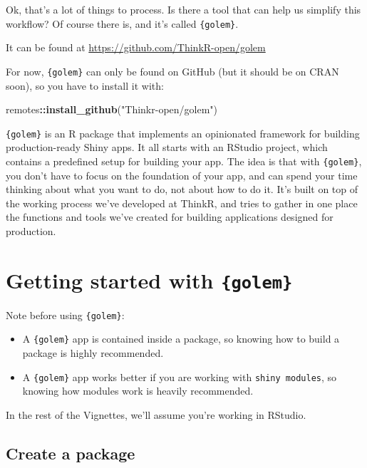 \documentclass[]{book}
\newenvironment{Shaded}{\begin{snugshade}}{\end{snugshade}}
\newcommand{\KeywordTok}[1]{\textcolor[rgb]{0.13,0.29,0.53}{\textbf{#1}}}
\newcommand{\NormalTok}[1]{#1}
\newcommand{\OperatorTok}[1]{\textcolor[rgb]{0.81,0.36,0.00}{\textbf{#1}}}
\newcommand{\StringTok}[1]{\textcolor[rgb]{0.31,0.60,0.02}{#1}}
\begin{document}
Ok, that's a lot of things to process. Is there a tool that can help us simplify this workflow? Of course there is, and it's called \texttt{\{golem\}}.

It can be found at \url{https://github.com/ThinkR-open/golem}

For now, \texttt{\{golem\}} can only be found on GitHub (but it should be on CRAN soon), so you have to install it with:

\begin{Shaded}
\begin{Highlighting}[]
\NormalTok{remotes}\OperatorTok{::}\KeywordTok{install_github}\NormalTok{(}\StringTok{"Thinkr-open/golem"}\NormalTok{)}
\end{Highlighting}
\end{Shaded}

\texttt{\{golem\}} is an R package that implements an opinionated framework for building production-ready Shiny apps. It all starts with an RStudio project, which contains a predefined setup for building your app. The idea is that with \texttt{\{golem\}}, you don't have to focus on the foundation of your app, and can spend your time thinking about what you want to do, not about how to do it. It's built on top of the working process we've developed at ThinkR, and tries to gather in one place the functions and tools we've created for building applications designed for production.

\hypertarget{getting-started-with-golem}{%
\section{\texorpdfstring{Getting started with \texttt{\{golem\}}}{Getting started with \{golem\}}}\label{getting-started-with-golem}}

Note before using \texttt{\{golem\}}:

\begin{itemize}
\item
  A \texttt{\{golem\}} app is contained inside a package, so knowing how to build a package is highly recommended.
\item
  A \texttt{\{golem\}} app works better if you are working with \texttt{shiny\ modules}, so knowing how modules work is heavily recommended.
\end{itemize}

In the rest of the Vignettes, we'll assume you're working in RStudio.

\hypertarget{create-a-package}{%
\subsection{Create a package}\label{create-a-package}}
\end{document}
